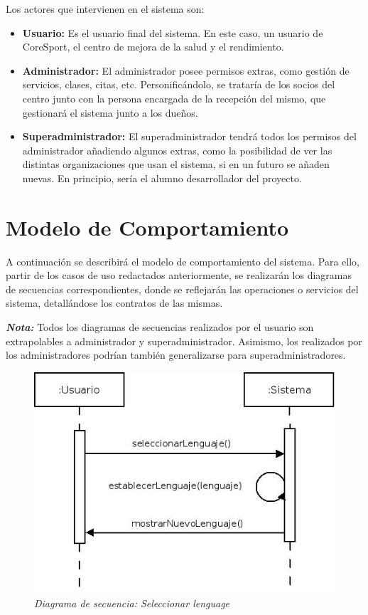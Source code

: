 Los actores que intervienen en el sistema son: 

\begin{itemize}
\item \textbf{Usuario:} Es el usuario final del sistema. En este caso, un usuario de CoreSport, el centro de mejora de la salud y el rendimiento.
\item \textbf{Administrador:} El administrador posee permisos extras, como gestión de servicios, clases, citas, etc. Personificándolo, se trataría de los socios del centro junto con la persona encargada de la recepción del mismo, que gestionará el sistema junto a los dueños.
\item \textbf{Superadministrador:} El superadministrador tendrá todos los permisos del administrador añadiendo algunos extras, como la posibilidad de ver las distintas organizaciones que usan el sistema, si en un futuro se añaden nuevas. En principio, sería el alumno desarrollador del proyecto.
\end {itemize}



\section{Modelo de Comportamiento}
A continuación se describirá el modelo de comportamiento del sistema. Para ello, partir de los casos de uso redactados anteriormente, se realizarán los diagramas de secuencias correspondientes, donde se reflejarán las operaciones o servicios del sistema, detallándose los contratos de las mismas.

\textbf{\textit{Nota:}} Todos los diagramas de secuencias realizados por el usuario son extrapolables a administrador y superadministrador. Asimismo, los realizados por los administradores podrían también generalizarse para superadministradores. 


\vspace{10mm} %

\begin{figure}[H]
\centering
  \includegraphics[scale=.55]{img/secuencias/seleccionar-idioma.jpeg}
  \caption{\textit{Diagrama de secuencia: Seleccionar lenguage}}
  \label{fig:secuencia-seleccionar-lenguaje}
\end{figure}


